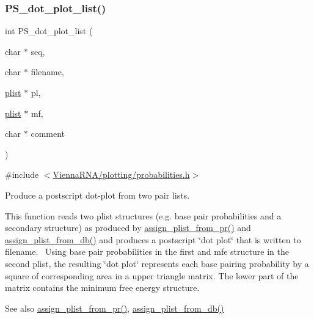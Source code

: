 \subsubsection{\texorpdfstring{PS\_dot\_plot\_list()}{PS\_dot\_plot\_list()}}
{\footnotesize\ttfamily int P\+S\+\_\+dot\+\_\+plot\+\_\+list (\begin{DoxyParamCaption}\item[{char $\ast$}]{seq,  }\item[{char $\ast$}]{filename,  }\item[{\mbox{\hyperlink{group__data__structures_ga9608eed021ebfbdd7a901cfdc446c8e9}{plist}} $\ast$}]{pl,  }\item[{\mbox{\hyperlink{group__data__structures_ga9608eed021ebfbdd7a901cfdc446c8e9}{plist}} $\ast$}]{mf,  }\item[{char $\ast$}]{comment }\end{DoxyParamCaption})}



{\ttfamily \#include $<$\mbox{\hyperlink{probabilities_8h}{Vienna\+R\+N\+A/plotting/probabilities.\+h}}$>$}



Produce a postscript dot-\/plot from two pair lists. 

This function reads two plist structures (e.\+g. base pair probabilities and a secondary structure) as produced by \mbox{\hyperlink{group__part__func__global__deprecated_ga1cc05aaa9b0e7df2d3887e98321c2030}{assign\+\_\+plist\+\_\+from\+\_\+pr()}} and \mbox{\hyperlink{group__part__func__global__deprecated_gab61df77cf7949cd516181fce0c3d7d78}{assign\+\_\+plist\+\_\+from\+\_\+db()}} and produces a postscript \char`\"{}dot plot\char`\"{} that is written to \textquotesingle{}filename\textquotesingle{}.~\newline
Using base pair probabilities in the first and mfe structure in the second plist, the resulting \char`\"{}dot plot\char`\"{} represents each base pairing probability by a square of corresponding area in a upper triangle matrix. The lower part of the matrix contains the minimum free energy structure.

\begin{DoxySeeAlso}{See also}
\mbox{\hyperlink{group__part__func__global__deprecated_ga1cc05aaa9b0e7df2d3887e98321c2030}{assign\+\_\+plist\+\_\+from\+\_\+pr()}}, \mbox{\hyperlink{group__part__func__global__deprecated_gab61df77cf7949cd516181fce0c3d7d78}{assign\+\_\+plist\+\_\+from\+\_\+db()}}
\end{DoxySeeAlso}

